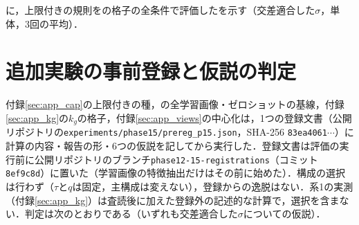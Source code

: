 に，上限付きの規則をの格子の全条件で評価した\FPR{}を示す（交差適合した$\sigma$，単体，3回の平均）．

\begin{table}[htbp]
\centering
\caption{種の上限$\tau{=}0.05$の規則の格子（\FPR{}[\%]，交差適合した$\sigma$，単体，3回の平均）．Storey型・単純BH法はそれぞれ上限なし／あり．種はDINOv3 L/16のビューで上限付きStorey型に選ばれた枚数（2つの折の合計）とそのうちIDの割合（\%）．}
\label{tab:caprec}
\vspace{1.5mm}

\end{table}

\section{追加実験の事前登録と仮説の判定}
\label{sec:app_hyp}
付録\ref{sec:app_cap}の上限付きの種，の全学習画像・ゼロショットの基線，付録\ref{sec:app_kg}の$k_g$の格子，付録\ref{sec:app_views}の中心化は，1つの登録文書（公開リポジトリの\texttt{experiments/phase15/prereg\_p15.json}，SHA-256 \texttt{83ea4061}$\cdots$）に計算の内容・報告の形・6つの仮説を記してから実行した．登録文書は評価の実行前に公開リポジトリのブランチ\texttt{phase12-15-registrations}（コミット\texttt{8ef9c8d}）に置いた（学習画像の特徴抽出だけはその前に始めた）．構成の選択は行わず（$\tau$と$q$は固定，主構成は変えない），登録からの逸脱はない．系1の実測（付録\ref{sec:app_kg}）は査読後に加えた登録外の記述的な計算で，選択を含まない．判定は次のとおりである（いずれも交差適合した$\sigma$についての仮説）．
